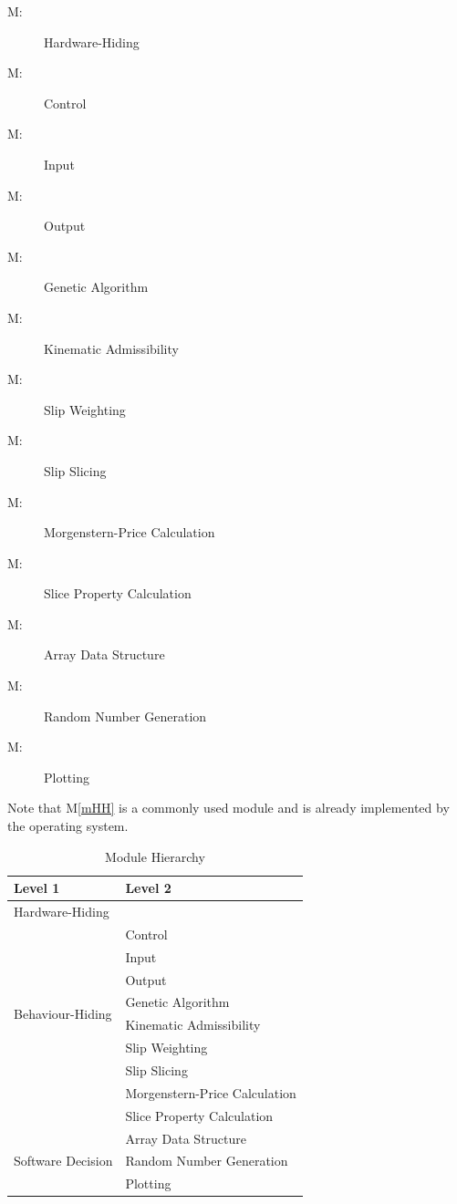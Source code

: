 \documentclass[12pt, titlepage]{article}
\newcounter{mnum}
\newcommand{\mthemnum}{M\themnum}
\newcommand{\mref}[1]{M\ref{#1}}
\begin{document}
\begin{description}
\item [ \mthemnum \label{mHH}:] Hardware-Hiding
\item [ \mthemnum \label{mControl}:] Control
\item [ \mthemnum \label{mInput}:] Input
\item [ \mthemnum \label{mOutput}:] Output
\item [ \mthemnum \label{mGenAlg}:] Genetic
  Algorithm
\item [ \mthemnum \label{mKinAdm}:] Kinematic
  Admissibility
\item [ \mthemnum \label{mSlipWeight}:] Slip Weighting
\item [ \mthemnum \label{mSlipSlicer}:] Slip Slicing
\item [ \mthemnum \label{mMorgPrice}:]
  Morgenstern-Price Calculation
\item [ \mthemnum \label{mSliceProperty}:] Slice
  Property Calculation
\item [ \mthemnum \label{mArrayOps}:] Array Data Structure
\item [ \mthemnum \label{mRandNum}:] Random Number     
Generation
\item [ \mthemnum \label{mPlot}:] Plotting
\end{description}

Note that \mref{mHH} is a commonly used module and is already
implemented by the operating system.

\begin{table}[h!]
\centering
\begin{tabular}{p{} p{} }
\toprule
\textbf{Level 1} & \textbf{Level 2} \\
\midrule

{Hardware-Hiding} & ~ \\
\midrule

\multirow{8}{0.3\textwidth}{Behaviour-Hiding} &
Control \\
& Input \\
& Output \\
& Genetic Algorithm \\
& Kinematic Admissibility \\
& Slip Weighting \\
& Slip Slicing \\
& Morgenstern-Price Calculation \\
& Slice Property Calculation \\
\midrule

\multirow{3}{0.3\textwidth}{Software Decision} &
Array Data Structure \\
& Random Number Generation \\
& Plotting \\
\bottomrule

\end{tabular}
\caption{Module Hierarchy}
\label{Table:Decomp}
\end{table}
\end{document}
